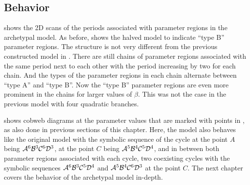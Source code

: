 \subsection{Behavior}
\label{sec:setup.arch.behavior}

 shows the 2D scans of the periods associated with parameter regions in the archetypal model.
As before,  shows the halved model to indicate ``type B'' parameter regions.
The structure is not very different from the previous constructed model in .
There are still chains of parameter regions associated with the same period next to each other with the period increasing by two for each chain.
And the types of the parameter regions in each chain alternate between ``type A'' and ``type B''.
Now the ``type B'' parameter regions are even more prominent in the chains for larger values of $\beta$.
This was not the case in the previous model with four quadratic branches.

 shows cobweb diagrams at the parameter values that are marked with points in , as also done in previous sections of this chapter.
Here, the model also behaves like the original model with the symbolic sequence of the cycle at the point $A$ being $\mathcal{A}^6\mathcal{B}^3\mathcal{C}^6\mathcal{D}^3$, at the point $C$ being $\mathcal{A}^5\mathcal{B}^4\mathcal{C}^5\mathcal{D}^4$, and in between both parameter regions associated with each cycle, two coexisting cycles with the symbolic sequences $\mathcal{A}^6\mathcal{B}^3\mathcal{C}^5\mathcal{D}^4$ and $\mathcal{A}^5\mathcal{B}^4\mathcal{C}^6\mathcal{D}^3$ at the point $C$.
The next chapter covers the behavior of the archetypal model in-depth.

